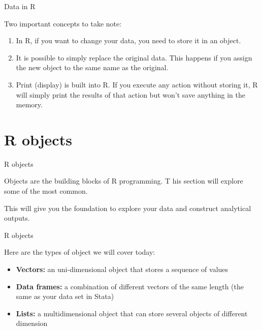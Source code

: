 \documentclass[ignorenonframetext,]{beamer}
\providecommand{\tightlist}{%
  \setlength{\itemsep}{0pt}\setlength{\parskip}{0pt}}
\begin{document}
\begin{frame}{Data in R}

\begin{block}{Two important concepts to take note:}

\begin{enumerate}
\def\labelenumi{\arabic{enumi}.}
\tightlist
\item
  In R, if you want to change your data, you need to store it in an
  object.
\item
  It is possible to simply replace the original data. This happens if
  you assign the new object to the same name as the original.
\item
  Print (display) is built into R. If you execute any action without
  storing it, R will simply print the results of that action but won't
  save anything in the memory.
\end{enumerate}

\end{block}

\end{frame}

\section{R objects}\label{r-objects}

\begin{frame}{R objects}

Objects are the building blocks of R programming. T his section will
explore some of the most common.

This will give you the foundation to explore your data and construct
analytical outputs.

\end{frame}

\begin{frame}{R objects}

Here are the types of object we will cover today:

\begin{itemize}
\tightlist
\item
  \textbf{Vectors:} an uni-dimensional object that stores a sequence of
  values
\item
  \textbf{Data frames:} a combination of different vectors of the same
  length (the same as your data set in Stata)
\item
  \textbf{Lists:} a multidimensional object that can store several
  objects of different dimension
\end{itemize}

\end{frame}
\end{document}
